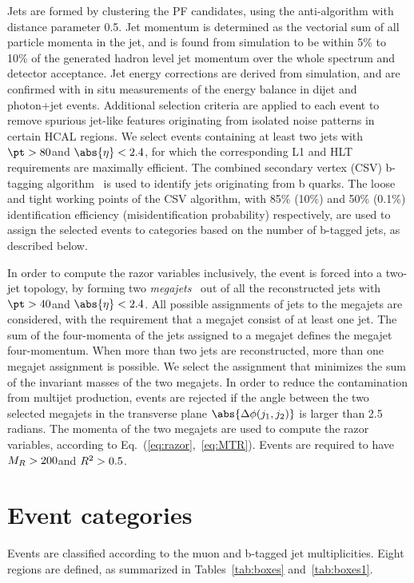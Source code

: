 Jets are formed by clustering the PF candidates, using the anti-\kt algorithm with distance
parameter 0.5. Jet momentum is determined as the vectorial sum of all
particle momenta in the jet, and is found from simulation to be within
5\% to 10\% of the generated hadron level jet momentum over the whole \pt spectrum and
detector acceptance.
 Jet energy corrections
are derived from simulation, and are confirmed with in situ
measurements of the energy balance in dijet and photon+jet events.
Additional selection criteria are applied to each event to remove
spurious jet-like features originating from isolated noise patterns in certain HCAL regions.
We select events containing at least two jets with $\pt>80$\GeV and $\abs{\eta}<2.4$, for
which the corresponding L1 and HLT requirements are maximally
efficient. The combined secondary vertex (CSV) b-tagging
algorithm~\cite{btag8TeV,btag7TeV} is used to identify jets originating from b
quarks. The loose and tight working points of the CSV algorithm, with
85\% (10\%) and 50\% (0.1\%) identification efficiency (misidentification probability) respectively, are
used to assign the selected events to categories based on the number
of b-tagged jets, as described below.

In order to compute the razor variables inclusively, the event is forced into a two-jet topology, by forming two \textit{megajets}~\cite{Chatrchyan:2014goa} out of all the reconstructed
jets with $\pt>40$\GeV and $\abs{\eta}<2.4$. All possible assignments of
jets to the megajets are considered, with the requirement that a
megajet consist of at least one jet. The sum of the four-momenta of
the jets assigned to a megajet defines the megajet
four-momentum. When more than two jets are reconstructed, more than
one megajet assignment is possible. We select the assignment that
minimizes the sum of the invariant masses of the two megajets.
In order to reduce the contamination from multijet production, events are
rejected if the angle between the two selected megajets in the
transverse plane $\abs{ \Delta\phi (j_{1}, j_{2})}$ is larger
than 2.5 radians. The momenta of the two megajets are used to compute
the razor variables, according to Eq.~(\ref{eq:razor},~\ref{eq:MTR}).  Events are
required to have $M_R>200$\GeV and $R^2>0.5$.

\section{Event categories}\label{sec:sampleDef}

Events are classified according to the muon and
b-tagged jet multiplicities.  Eight regions are defined, as summarized
in Tables~\ref{tab:boxes} and~\ref{tab:boxes1}.

